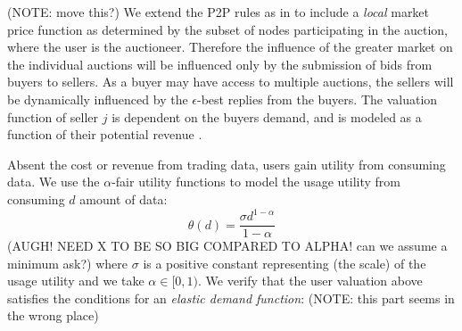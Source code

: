 \documentclass[12pt]{article}
\theoremstyle{definition}
\begin{document}
\begin{multicols}{2}
(NOTE: move this?)
We extend the P2P rules as in \cite{semret} to include a \emph{local} market
price function as determined by the subset of nodes participating in the
auction, where the user is the auctioneer. Therefore the influence of the greater market on the individual
auctions will be influenced only by the submission of bids from buyers to
sellers. As a buyer may have access to multiple auctions, the sellers will be
dynamically influenced by the $\epsilon$-best replies from the buyers. The
valuation function of seller $j$ is dependent on the buyers demand, and is
modeled as a function of their potential revenue \cite{semret}. 

Absent the cost or revenue from trading data, users gain utility from consuming
data. We use the $\alpha$-fair utility functions \cite{zheng} to model the
usage utility from consuming $d$ amount of data:
\begin{equation}
    \theta(d) = \frac{\sigma d^{1-\alpha}}{1-\alpha}
\end{equation}
(AUGH! NEED X TO BE SO BIG COMPARED TO ALPHA! can we assume a minimum ask?)
where $\sigma$ is a positive constant representing (the scale) of the usage
utility and we take $\alpha \in [0, 1)$.
We verify that the user valuation above satisfies the conditions for an
\emph{elastic demand function}: (NOTE: this part seems in the wrong place)


\end{multicols}
\end{document}
